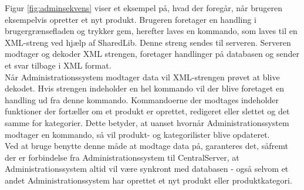 Figur \ref{fig:adminsekvens} viser et eksempel på, hvad der foregår, når brugeren eksempelvis opretter et nyt produkt. Brugeren foretager en handling i brugergrænsefladen og trykker gem, herefter laves en kommando, som laves til en XML-streng ved hjælp af SharedLib. Denne streng sendes til serveren. Serveren modtager og dekoder XML strengen, foretager handlinger på databasen og sender et svar tilbage i XML format.\\
Når Administrationssystem modtager data vil XML-strengen prøvet at blive dekodet. Hvis strengen indeholder en hel kommando vil der blive foretaget en handling ud fra denne kommando. Kommandoerne der modtages indeholder funktioner der fortæller om et produkt er oprettet, redigeret eller slettet og det samme for kategorier. Dette betyder, at uanset hvornår Administrationssystem modtager en kommando, så vil produkt- og kategorilister blive opdateret.\\
Ved at bruge benytte denne måde at modtage data på, garanteres det, såfremt der er forbindelse fra Administrationssystem til CentralServer, at Administrationssystem altid vil være synkront med databasen - også selvom et andet Administrationssystem har oprettet et nyt produkt eller produktkategori.
